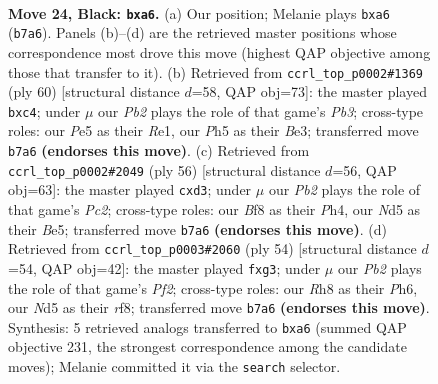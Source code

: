 \documentclass[11pt]{article}
\begin{document}
\clearpage

\begin{figure}[p]\centering
\begin{subfigure}{0.46\textwidth}\centering
\resizebox{\linewidth}{!}{%
\newchessgame
\chessboard[
  setfen={r1k2b1r/pp6/P7/2PnpP1p/1P5R/8/8/R1B1KB2 b Q - 0 24},
  showmover=false,
  pgfstyle=straightmove, color=movearrow, markmove={b7-a6}
]}
\caption{}
\end{subfigure}\hfill
\begin{subfigure}{0.46\textwidth}\centering
\resizebox{\linewidth}{!}{%
\newchessgame
\chessboard[
  setfen={3r2k1/4r1p1/6bp/1p6/2p3P1/1P2BP1P/2P1R2K/4R3 w - - 1 31},
  showmover=false,
  pgfstyle=straightmove, color=movearrow, markmove={b3-c4}
]}
\caption{}
\end{subfigure}
\\[4pt]
\begin{subfigure}{0.46\textwidth}\centering
\resizebox{\linewidth}{!}{%
\newchessgame
\chessboard[
  setfen={3r2k1/p4rp1/2b1p2p/4B3/PR5P/3p1P2/2P3P1/4R1K1 w - - 0 29},
  showmover=false,
  pgfstyle=straightmove, color=movearrow, markmove={c2-d3}
]}
\caption{}
\end{subfigure}\hfill
\begin{subfigure}{0.46\textwidth}\centering
\resizebox{\linewidth}{!}{%
\newchessgame
\chessboard[
  setfen={5rk1/p2b3p/6pP/8/8/3r2p1/PR3PB1/4R1K1 w - - 0 28},
  showmover=false,
  pgfstyle=straightmove, color=movearrow, markmove={f2-g3}
]}
\caption{}
\end{subfigure}
\caption{\textbf{Move 24, Black: \texttt{bxa6}.} (a) Our position; Melanie plays \texttt{bxa6} (\texttt{b7a6}). Panels (b)--(d) are the retrieved master positions whose correspondence most drove this move (highest QAP objective among those that transfer to it). (b) Retrieved from \texttt{ccrl\_top\_p0002\#1369} (ply 60) [structural distance $d$=58, QAP obj=73]: the master played \texttt{bxc4}; under $\mu$ our \emph{Pb2} plays the role of that game's \emph{Pb3}; cross-type roles: our \emph{P}e5 as their \emph{R}e1, our \emph{P}h5 as their \emph{B}e3; transferred move \texttt{b7a6} \textbf{(endorses this move)}. (c) Retrieved from \texttt{ccrl\_top\_p0002\#2049} (ply 56) [structural distance $d$=56, QAP obj=63]: the master played \texttt{cxd3}; under $\mu$ our \emph{Pb2} plays the role of that game's \emph{Pc2}; cross-type roles: our \emph{B}f8 as their \emph{P}h4, our \emph{N}d5 as their \emph{B}e5; transferred move \texttt{b7a6} \textbf{(endorses this move)}. (d) Retrieved from \texttt{ccrl\_top\_p0003\#2060} (ply 54) [structural distance $d$=54, QAP obj=42]: the master played \texttt{fxg3}; under $\mu$ our \emph{Pb2} plays the role of that game's \emph{Pf2}; cross-type roles: our \emph{R}h8 as their \emph{P}h6, our \emph{N}d5 as their \emph{r}f8; transferred move \texttt{b7a6} \textbf{(endorses this move)}. Synthesis: 5 retrieved analogs transferred to \texttt{bxa6} (summed QAP objective 231, the strongest correspondence among the candidate moves); Melanie committed it via the \texttt{search} selector.}
\label{fig:thought-m47}
\end{figure}
\end{document}
